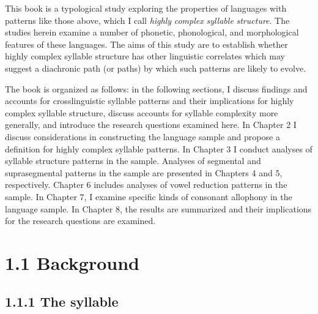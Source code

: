   This book is a typological study exploring the properties of languages with patterns like those above, which I call \textit{highly} \textit{complex} \textit{syllable} \textit{structure}. The studies herein examine a number of phonetic, phonological, and morphological features of these languages. The aims of this study are to establish whether highly complex syllable structure has other linguistic correlates which may suggest a diachronic path (or paths) by which such patterns are likely to evolve.



  The book is organized as follows: in the following sections, I discuss findings and accounts for crosslinguistic syllable patterns and their implications for highly complex syllable structure, discuss accounts for syllable complexity more generally, and introduce the research questions examined here. In Chapter 2 I discuss considerations in constructing the language sample and propose a definition for highly complex syllable patterns. In Chapter 3 I conduct analyses of syllable structure patterns in the sample. Analyses of segmental and suprasegmental patterns in the sample are presented in Chapters 4 and 5, respectively. Chapter 6 includes analyses of vowel reduction patterns in the sample. In Chapter 7, I examine specific kinds of consonant allophony in the language sample. In Chapter 8, the results are summarized and their implications for the research questions are examined.


\section{1.1 Background}
\subsection{1.1.1 The syllable}

